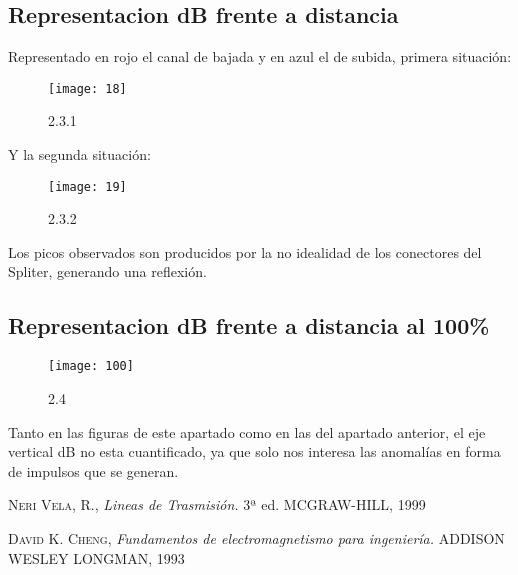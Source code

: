 \documentclass[12pt]{article}
\begin{document}
\subsection{Representacion dB frente a distancia}
Representado en rojo el canal de bajada y en azul el de subida, primera situación:
\begin{figure}[H]
  \centering
    \texttt{[image: 18]}
  \caption{2.3.1}
  \label{fig:18}
\end{figure} 
Y la segunda situación:
\begin{figure}[H]
  \centering
    \texttt{[image: 19]}
  \caption{2.3.2}
  \label{fig:19}
\end{figure}
Los picos observados son producidos por la no idealidad de los conectores del Spliter, generando una reflexión.

\subsection{Representacion dB frente a distancia al 100\%}

\begin{figure}[H]
  \centering
    \texttt{[image: 100]}
  \caption{2.4}
  \label{fig:100}
\end{figure}
Tanto en las figuras de este apartado como en las del apartado anterior, el eje vertical dB no esta cuantificado, ya que solo nos interesa las anomalías en forma de impulsos que se generan.

\newpage
\begin{thebibliography}{x}
 \textsc{Neri Vela, R.},
\textit{Lineas de Trasmisión.}
3ª ed. MCGRAW-HILL, 1999  

 \textsc{David K. Cheng},
\textit{Fundamentos de electromagnetismo para ingeniería.}
 ADDISON WESLEY LONGMAN, 1993  
\end{thebibliography}
\end{document}
